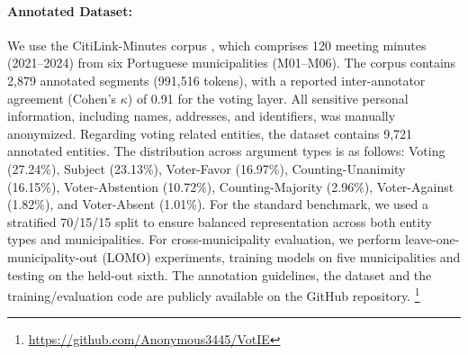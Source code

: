 \documentclass[11pt]{article}
\begin{document}





\paragraph{Annotated Dataset:} We use the CitiLink-Minutes corpus \cite{CitiLinkMinutes2025}, which comprises 120 meeting minutes (2021–2024) from six Portuguese municipalities (M01--M06). The corpus contains 2,879 annotated segments (991,516 tokens), with a reported inter-annotator agreement (Cohen's $\kappa$) of 0.91 for the voting layer. All sensitive personal information, including names, addresses, and identifiers, was manually anonymized. Regarding voting related entities, the dataset contains 9,721 annotated entities. The distribution across argument types is as follows: Voting (27.24\%), Subject (23.13\%), Voter-Favor (16.97\%), Counting-Unanimity (16.15\%), Voter-Abstention (10.72\%), Counting-Majority (2.96\%), Voter-Against (1.82\%), and Voter-Absent (1.01\%). For the standard benchmark, we used a stratified 70/15/15 split to ensure balanced representation across both entity types and municipalities. For cross-municipality evaluation, we perform leave-one-municipality-out (LOMO) experiments, training models on five municipalities and testing on the held-out sixth. The annotation guidelines, the dataset and the training/evaluation code are publicly available on the GitHub repository. \footnote{\url{https://github.com/Anonymous3445/VotIE}}
\end{document}
